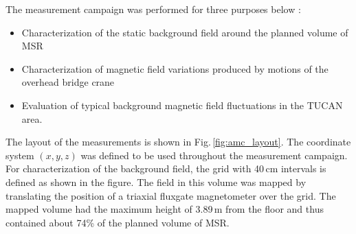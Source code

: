 The  measurement campaign was performed for  three purposes below :
\begin{itemize}
    \item Characterization of the static background field around the planned volume of MSR
    \item Characterization of magnetic field variations produced by motions of the overhead bridge crane
        \item Evaluation of  typical background magnetic field fluctuations in the TUCAN area.
\end{itemize}
The layout of the measurements is shown in Fig.\,\ref{fig:amc_layout}. The coordinate system $(x,y,z)$ was defined to be used throughout the measurement campaign. 
For characterization of the background field, the grid with 40\,cm intervals is defined as shown in the figure. The field in this volume was mapped by translating the position of a triaxial fluxgate magnetometer over the grid. The mapped volume had the maximum height of 3.89\,m from the  floor and thus contained about 74\% of the planned volume of MSR. 
